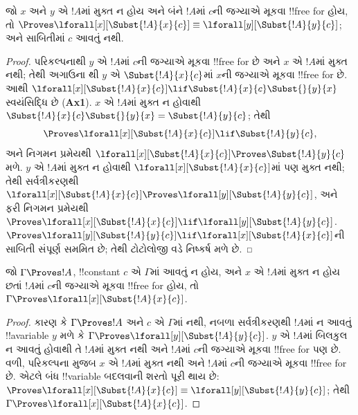 \documentclass[../../../include/open-logic-section]{subfiles}
\begin{document}
\begin{lem}[બંધ ચલનું પરિવર્તન]
જો $x$ અને $y$ એ $!A$માં મુક્ત
ન હોય અને બંને $!A$માં $c$ની
જગ્યાએ મૂકવા !!{free for}
હોય, તો $\Proves \lforall[x][\Subst{!A}{x}{c}] \equiv
\lforall[y][\Subst{!A}{y}{c}]$;
અને સાબિતીમાં $c$ આવતું નથી.
\end{lem}

\begin{proof}
પરિકલ્પનાથી $y$ એ $!A$માં
$c$ની જગ્યાએ મૂકવા !!{free for}
છે અને $x$ એ $!A$માં મુક્ત
નથી; તેથી અગાઉના
થી $y$ એ
$\Subst{!A}{x}{c}$માં
$x$ની જગ્યાએ મૂકવા
!!{free for} છે. આથી
$\lforall[x][\Subst{!A}{x}{c}] \lif \Subst{!A}{x}{c} \Subst{}{y}{x}$
સ્વયંસિદ્ધિ છે (\textbf{Ax1}).
$x$ એ $!A$માં મુક્ત
ન હોવાથી
$\Subst{!A}{x}{c} \Subst{}{y}{x} = \Subst{!A}{y}{c}$;
તેથી
\[
\Proves \lforall[x][\Subst{!A}{x}{c}] \lif \Subst{!A}{y}{c}, 
\] 
અને નિગમન પ્રમેયથી
$\lforall[x][\Subst{!A}{x}{c}] \Proves
\Subst{!A}{y}{c}$ મળે.
$y$ એ $!A$માં મુક્ત
ન હોવાથી
$\lforall[x][\Subst{!A}{x}{c}]$માં
પણ મુક્ત નથી; તેથી
સર્વત્રીકરણથી
$\lforall[x][\Subst{!A}{x}{c}] \Proves \lforall[y][\Subst{!A}{y}{c}]$,
અને ફરી નિગમન
પ્રમેયથી $\Proves
\lforall[x][\Subst{!A}{x}{c}] \lif \lforall[y][\Subst{!A}{y}{c}]$.
$\Proves \lforall[y][\Subst{!A}{y}{c}] \lif \lforall[x]
[\Subst{!A}{x}{c}]$ની
સાબિતી સંપૂર્ણ
સમમિત છે; તેથી
ટોટોલોજી વડે
નિષ્કર્ષ મળે છે.
\end{proof}

\begin{thm}
જો $\Gamma \Proves !A$, !!{constant}
$c$ એ $\Gamma$માં આવતું ન હોય,
અને $x$ એ $!A$માં મુક્ત
ન હોય છતાં $!A$માં
$c$ની જગ્યાએ મૂકવા
!!{free for} હોય, તો
$\Gamma \Proves \lforall[x][\Subst{!A}{x}{c}]$.
\end{thm}

\begin{proof}
કારણ કે $\Gamma \Proves !A$
અને $c$ એ $\Gamma$માં
નથી, નબળા સર્વત્રીકરણથી
$!A$માં ન આવતું
!!a{variable} $y$ મળે કે
$\Gamma \Proves \lforall[y][\Subst{!A}{y}{c}]$.
$y$ એ $!A$માં બિલકુલ
ન આવતું હોવાથી તે
$!A$માં મુક્ત નથી
અને $!A$માં $c$ની જગ્યાએ
મૂકવા !!{free for} પણ છે.
વળી, પરિકલ્પના મુજબ
$x$ એ $!A$માં
મુક્ત નથી અને
$!A$માં $c$ની જગ્યાએ
મૂકવા !!{free for} છે.
એટલે બંધ !!{variable}
બદલવાની શરતો પૂરી થાય છે:
$\Proves \lforall[x][\Subst{!A}{x}{c}] \equiv
\lforall[y][\Subst{!A}{y}{c}]$;
તેથી $\Gamma \Proves
\lforall[x][\Subst{!A}{x}{c}]$.
\end{proof}
\end{document}
